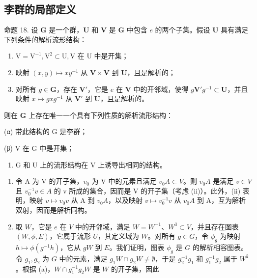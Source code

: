 \subsection{李群的局部定义}

命题 18. 设 \(\mathbf{G}\) 是一个群，\(\mathbf{U}\) 和 \(\mathbf{V}\) 是 \(\mathbf{G}\) 中包含 \(e\) 的两个子集。假设 \(\mathbf{U}\) 具有满足下列条件的解析流形结构：

\begin{enumerate}
\def\labelenumi{(\roman{enumi})}
\item
  \(\mathrm{V} = \mathrm{V}^{-1},\mathrm{V}^2\subset \mathrm{U},\mathrm{V}\) 在 U 中是开集；
\item
  映射 \((x,y)\mapsto xy^{-1}\) 从 \(\mathbf{V}\times \mathbf{V}\) 到 \(\mathbf{U}\)，且是解析的；
\item
  对所有 \(g \in \mathbf{G}\)，存在 \(\mathbf{V}'\)，它是 \(e\) 在 \(\mathbf{V}\) 中的开邻域，使得 \(g\mathbf{V}'g^{-1} \subset \mathbf{U}\)，并且映射 \(x \mapsto gxg^{-1}\) 从 \(\mathbf{V}'\) 到 \(\mathbf{U}\)，且是解析的。
\end{enumerate}

则在 \(\mathbf{G}\) 上存在唯一一个具有下列性质的解析流形结构：

(α) 带此结构的 G 是李群；

(β) V 在 G 中是开集；

\begin{enumerate}
\def\labelenumi{(\Alph{enumi})}
\setcounter{enumi}{24}
\tightlist
\item
  G 和 U 上的流形结构在 V 上诱导出相同的结构。
\end{enumerate}

\begin{enumerate}
\def\labelenumi{(\alph{enumi})}
\item
  令 A 为 V 的开子集，\(v_{0}\) 为 V 中的元素且满足 \(v_{0}A \subset V\)。则 \(v_{0}A\) 是满足 \(v \in V\) 且 \(v_{0}^{-1}v \in A\) 的 v 所成的集合，因而是 V 的开子集（考虑 (ii)）。此外，(ii) 表明，映射 \(v \mapsto v_{0}v\) 从 A 到 \(v_{0}A\)，以及映射 \(v \mapsto v_{0}^{-1}v\) 从 \(v_{0}A\) 到 A，互为解析双射，因而是解析同构。
\item
  取 \(W\)，它是 \(e\) 在 \(V\) 中的开邻域，满足 \(W = W^{-1}\)、\(W^3 \subset V\)，并且存在图表 \((W, \phi, E)\)，它属于流形 \(U\)，其定义域为 \(W\)。对所有 \(g \in G\)，令 \(\phi_g\) 为映射 \(h \mapsto \phi(g^{-1}h)\)，它从 \(gW\) 到 \(E\)。我们证明，图表 \(\phi_g\) 是 \(G\) 的解析相容图表。令 \(g_1, g_2\) 为 \(G\) 中的元素，满足 \(g_1W \cap g_2W \neq \emptyset\)，于是 \(g_2^{-1}g_1\) 和 \(g_1^{-1}g_2\) 属于 \(W^2\)。根据 (a)，\(W \cap g_1^{-1}g_2W\) 是 \(W\) 的开子集，因此
\end{enumerate}

